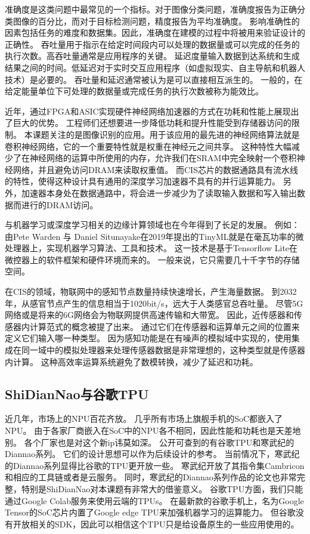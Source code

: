 准确度是这类问题中最常见的一个指标。对于图像分类问题，准确度报告为正确分类图像的百分比，而对于目标检测问题，精度报告为平均准确度。
影响准确性的因素包括任务的难度和数据集。因此，准确度在建模的过程中将被用来验证设计的正确性。
吞吐量用于指示在给定时间段内可以处理的数据量或可以完成的任务的执行次数。高吞吐量通常是应用程序的关键。
延迟度量输入数据到达系统和生成结果之间的时间。低延迟对于实时交互应用程序（如虚拟现实、自主导航和机器人技术）是必要的。
吞吐量和延迟通常被认为是可以直接相互派生的。
一般的，在给定能量单位下可处理的数据量或完成任务的执行次数被称为能效比。


近年，通过FPGA和ASIC实现硬件神经网络加速器的方式在功耗和性能上展现出了巨大的优势。
工程师们还想要进一步降低功耗和提升性能受到存储器访问的限制。
本课题关注的是图像识别的应用。用于该应用的最先进的神经网络算法就是卷积神经网络，它的一个重要特性就是权重在神经元之间共享。
这种特性大幅减少了在神经网络的运算中所使用的内存，允许我们在SRAM中完全映射一个卷积神经网络，并且避免访问DRAM来读取权重值。
而CIS芯片的数据通路具有流水线的特性，使得这种设计具有通用的深度学习加速器不具有的并行运算能力。
另外，加速器本身处在数据通路中，将会进一步减少为了读取输入数据和写入输出数据而进行的DRAM访问。   

与机器学习或深度学习相关的边缘计算领域也在今年得到了长足的发展。
例如：由Pete Warden 与 Daniel Situnayake在2019年提出的TinyML就是在毫瓦功率的微处理器上，实现机器学习算法、工具和技术。%
这一技术是基于Tensorflow Lite在微控器上的软件框架和硬件环境而来的。
一般来说，它只需要几十千字节的存储空间。  

在CIS的领域，物联网中的感知节点数量持续快速增长，产生海量数据。
到2032年，从感官节点产生的信息相当于1020bit/s，远大于人类感官总吞吐量。%
尽管5G网络或是将来的6G网络会为物联网提供高速传输和大带宽。
因此，近传感器和传感器内计算范式的概念被提了出来。
通过它们在传感器和运算单元之间的位置来定义它们输入哪一种类型。
因为感知功能是在有噪声的模拟域中实现的，使用集成在同一域中的模拟处理器来处理传感器数据是非常理想的，这种类型就是传感器内计算。
这种高效率运算系统避免了数模转换，减少了延迟和功耗。


\subsection{ShiDianNao与谷歌TPU}
近几年，市场上的NPU百花齐放。
几乎所有市场上旗舰手机的SoC都嵌入了NPU。
由于各家厂商嵌入在SoC中的NPU各不相同，因此性能和功耗也是天差地别。
各个厂家也是对这个新ip讳莫如深。
公开可查到的有谷歌TPU和寒武纪的Diannao系列。
它们的设计思想可以作为后续设计的参考。
当前情况下，寒武纪的Diannao系列显得比谷歌的TPU更开放一些。
寒武纪开放了其指令集Cambricon和相应的工具链或者是云服务。
同时，寒武纪的Diannao系列作品的论文也非常完整，特别是ShiDianNao对本课题有非常大的借鉴意义。
谷歌TPU方面，我们只能通过Google Colab服务来使用云端的TPUs。
在最新款的谷歌手机上，名为Google Tensor的SoC芯片内置了Google edge TPU来加强机器学习的运算能力。
但谷歌没有开放相关的SDK，因此可以相信这个TPU只是给设备原生的一些应用使用的。



